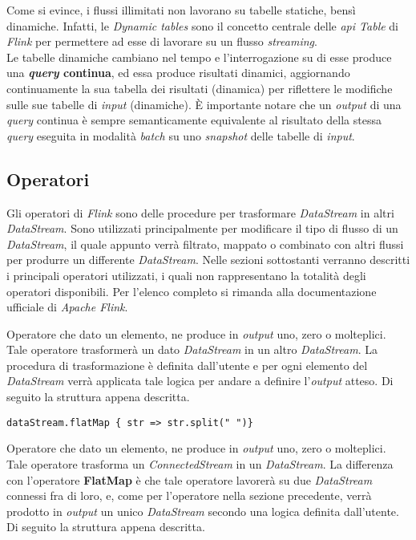 Come si evince, i flussi illimitati non lavorano su tabelle statiche, bensì dinamiche. Infatti, le \textit{Dynamic tables} sono il concetto centrale delle \textit{\textit{\gls{api}} Table} di \textit{Flink} per permettere ad esse di lavorare su un flusso \textit{streaming}.\\
Le tabelle dinamiche cambiano nel tempo e l'interrogazione su di esse produce una \textbf{\textit{\gls{query}} continua}, ed essa produce risultati dinamici, aggiornando continuamente la sua tabella dei risultati (dinamica) per riflettere le modifiche sulle sue tabelle di \textit{input} (dinamiche). È importante notare che un \textit{output} di una \textit{\gls{query}} continua è sempre semanticamente equivalente al risultato della stessa \textit{\gls{query}} eseguita in modalità \textit{batch} su uno \textit{\gls{snapshot}} delle tabelle di \textit{input}.



\subsection{Operatori}\label{sec:operatori}
Gli operatori di \textit{Flink} sono delle procedure per trasformare \textit{DataStream} in altri \textit{DataStream}. Sono utilizzati principalmente per modificare il tipo di flusso di un \textit{DataStream}, il quale appunto verrà filtrato, mappato o combinato con altri flussi per produrre un differente \textit{DataStream}. Nelle sezioni sottostanti verranno descritti i principali operatori utilizzati, i quali non rappresentano la totalità degli operatori disponibili. Per l'elenco completo si rimanda alla documentazione ufficiale di \textit{Apache Flink}.

Operatore che dato un elemento, ne produce in \textit{output} uno, zero o molteplici. Tale operatore trasformerà un dato \textit{DataStream} in un altro \textit{DataStream}. La procedura di trasformazione è definita dall'utente e per ogni elemento del \textit{DataStream} verrà applicata tale logica per andare a definire l'\textit{output} atteso. Di seguito la struttura appena descritta.

\begin{verbatim}
dataStream.flatMap { str => str.split(" ")}
\end{verbatim}
	
	
Operatore che dato un elemento, ne produce in \textit{output} uno, zero o molteplici. Tale operatore trasforma un \textit{ConnectedStream} in un \textit{DataStream}. La differenza con l'operatore \textbf{FlatMap} è che tale operatore lavorerà su due \textit{DataStream} connessi fra di loro, e, come per l'operatore nella sezione precedente, verrà prodotto in \textit{output} un unico \textit{DataStream} secondo una logica definita dall'utente. Di seguito la struttura appena descritta.

